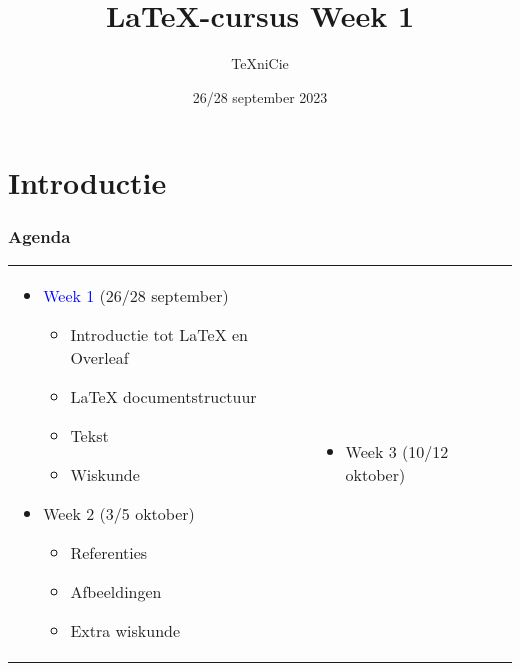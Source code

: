 \documentclass[allauthors,dutch,
defaultSlideCollection=tim]{../../cursuspresentatie}
\title{\LaTeX{}-cursus Week 1}
\author{\TeX niCie}
\date{26/28 september 2023}
\begin{document}
\section{Introductie}
\def\placetarget{\hypertarget{introductie}{}}


\begin{frame}
	\frametitle{Agenda}

	\begin{tabular}{p{6cm} p{7cm}}
	\begin{itemize}
		\item \textcolor{blue}{Week 1} (26/28 september)
	\begin{itemize}[label=\textbullet]
		\item Introductie tot LaTeX en Overleaf
		\item LaTeX documentstructuur
		\item Tekst
		\item Wiskunde
	\end{itemize}
		\item Week 2 (3/5 oktober)
	\begin{itemize}[label=\textbullet]
		\item Referenties
		\item Afbeeldingen
		\item Extra wiskunde
	\end{itemize}
	\end{itemize}
		&
	\begin{itemize}
		\item Week 3 (10/12 oktober)
			\begin{itemize}[label=\textbullet]

\end{itemize}
\end{itemize}
\end{tabular}
\end{frame}
\end{document}
